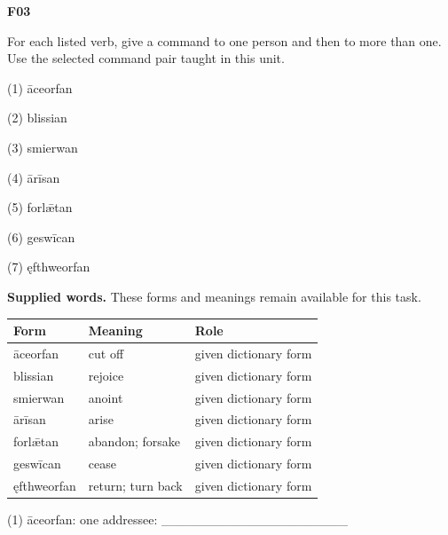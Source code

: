 \par\begin{minipage}{\linewidth}\raggedright
\textbf{F03}

For each listed verb, give a command to one person and then to more than one. Use the selected command pair taught in this unit.

(1) āceorfan

(2) blissian

(3) smierwan

(4) ārīsan

(5) forlǣtan

(6) geswīcan

(7) ęfthweorfan

\textbf{Supplied words.} These forms and meanings remain available for this task.

\par\begingroup
\fontsize{10.5}{13.2}\selectfont
\setlength{\LTleft}{0pt}\setlength{\LTright}{\fill}
\noindent
\begin{tabular}{@{}>{\raggedright\arraybackslash}p{34.27mm}>{\raggedright\arraybackslash}p{37.54mm}>{\raggedright\arraybackslash}p{46.57mm}@{}}
\toprule
\textbf{Form} & \textbf{Meaning} & \textbf{Role} \\
\midrule
āceorfan & cut off & given dictionary form \\
blissian & rejoice & given dictionary form \\
smierwan & anoint & given dictionary form \\
ārīsan & arise & given dictionary form \\
forlǣtan & abandon; forsake & given dictionary form \\
geswīcan & cease & given dictionary form \\
ęfthweorfan & return; turn back & given dictionary form \\
\bottomrule
\end{tabular}
\par\endgroup

(1) āceorfan: one addressee: \_\_\_\_\_\_\_\_\_\_\_\_\_\_\_\_\_\_\_\_


\end{minipage}
